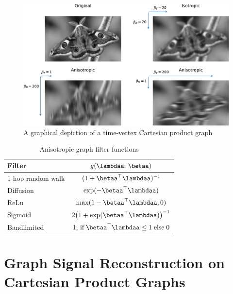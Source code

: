 \begin{figure}[b]
    \includegraphics[width=0.9\linewidth]{Figures/filter_types_butterfly.pdf}
    \caption[A time-vertex Cartesian product graph]{A graphical depiction of a time-vertex Cartesian product graph}
    \label{fig:TV}
\end{figure}
 
\begin{table}[t]
    \def\arraystretch{1.7}
    \small
    \begin{center}
    \begin{tabular}{|l|c|}
    \hline
    \textbf{Filter}   & $g(\lambdaa; \,\betaa)$    \\ 
    \hline
    1-hop random walk & $(1 + \betaa^\top\lambdaa)^{-1}$ \\
    \hline
    Diffusion         & $\exp(-\betaa^\top\lambdaa)$       \\
    \hline
    ReLu              & $\max (1 - \betaa^\top\lambdaa, 0)$  \\
    \hline
    Sigmoid           & $2 \big( 1 + \exp(\betaa^\top\lambdaa)\big)^{-1}$ \\
    \hline
    Bandlimited       & $1, \,\text{if} \; \betaa^\top\lambdaa \leq 1 \; \text{else} \; 0$   \\
    \hline
    \end{tabular}
    \end{center}
    \caption{Anisotropic graph filter functions}
    \label{tab:anis_filters}
    \end{table}



\section{Graph Signal Reconstruction on Cartesian Product Graphs}

